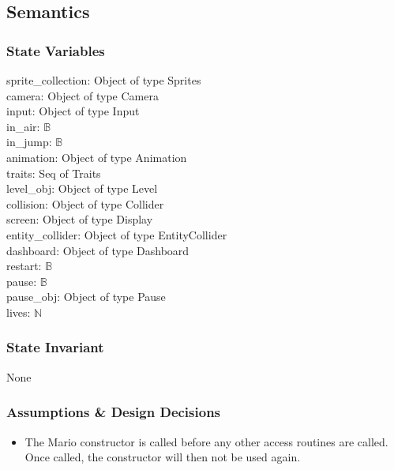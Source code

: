 \documentclass[12pt]{article}
\begin{document}
\subsection*{Semantics}
\subsubsection*{State Variables}
sprite\_collection: Object of type Sprites\\
camera: Object of type Camera\\
input: Object of type Input\\
in\_air: $\mathbb{B}$\\
in\_jump: $\mathbb{B}$\\
animation: Object of type Animation\\
traits: Seq of Traits\\
level\_obj: Object of type Level\\
collision: Object of type Collider\\
screen: Object of type Display\\
entity\_collider: Object of type EntityCollider\\
dashboard: Object of type Dashboard\\
restart: $\mathbb{B}$\\
pause: $\mathbb{B}$\\
pause\_obj: Object of type Pause\\
lives: $\mathbb{N}$\\

\subsubsection*{State Invariant}
None

\subsubsection*{Assumptions \& Design Decisions}

\begin{itemize}
    \item The Mario constructor is called before any other access routines are called. Once called, the constructor will then not be used again.
\end{itemize}
\end{document}

